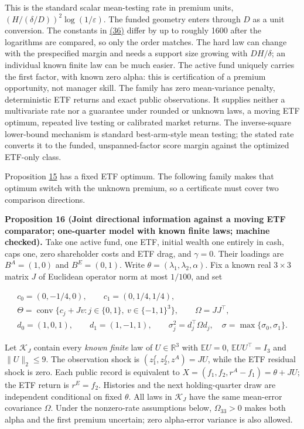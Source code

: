 \documentclass[11pt]{article}
\begin{document}
This is the standard scalar mean-testing rate in premium
units, \((H/(\delta/D))^2\log(1/\varepsilon)\). The funded
geometry enters through \(D\) as a unit conversion. The
constants in \hyperref[eq:36]{(36)} differ by up to roughly 1600 after the
logarithms are compared, so only the order matches. The hard
law can change with the prespecified margin and needs a
support size growing with \(DH/\delta\); an individual
known finite law can be much easier. The active fund uniquely
carries the first factor, with known zero alpha: this is
certification of a premium opportunity, not manager skill.
The family has zero mean-variance penalty, deterministic ETF
returns and exact public observations. It supplies neither a
multivariate rate nor a guarantee under rounded or unknown
laws, a moving ETF optimum, repeated live testing or calibrated
market returns. The inverse-square lower-bound mechanism is
standard best-arm-style mean testing; the stated rate converts it
to the funded, unspanned-factor score margin against the optimized
ETF-only class.

Proposition \hyperref[res:Proposition-15]{15} has a fixed ETF optimum. The following family
makes that optimum switch with the unknown premium, so a
certificate must cover two comparison directions.

\label{res:Proposition-16}
\textbf{Proposition 16 (Joint directional information against a moving ETF comparator; one-quarter model with known finite laws; machine checked).}
Take one active fund, one ETF, initial wealth one entirely in
cash, caps one, zero shareholder costs and ETF drag, and
\(\gamma=0\). Their loadings are
\(B^A=(1,0)\) and \(B^E=(0,1)\). Write
\(\theta=(\lambda_1,\lambda_2,\alpha)\). Fix a known real
\(3\times3\) matrix \(J\) of Euclidean operator norm at most
\(1/100\), and set

\begin{equation*}
\begin{gathered}
c_0=(0,-1/4,0),\qquad c_1=(0,1/4,1/4),\\
\Theta=\operatorname{conv}\{c_j+Jv:
j\in\{0,1\},\ v\in\{-1,1\}^3\},\qquad
\Omega=JJ^\top,\\
d_0=(1,0,1),\qquad d_1=(1,-1,1),\qquad
\sigma_j^2=d_j^\top\Omega d_j,\quad
\sigma=\max\{\sigma_0,\sigma_1\}.
\end{gathered}\tag{38}\label{eq:38}
\end{equation*}

Let \(\mathcal K_J\) contain every \emph{known finite} law of
\(U\in\mathbb R^3\) with
\(\mathbb E U=0\), \(\mathbb E UU^\top=I_3\) and
\(\|U\|_2\leq9\). The observation shock is
\((z^f_1,z^f_2,z^A)=JU\), while the ETF residual shock is
zero. Each public record is equivalent to
\(X=(f_1,f_2,r^A-f_1)=\theta+JU\); the ETF return is
\(r^E=f_2\). Histories and the next holding-quarter draw
are independent conditional on fixed \(\theta\). All laws
in \(\mathcal K_J\) have the same mean-error covariance
\(\Omega\). Under the nonzero-rate assumptions below,
\(\Omega_{33}>0\) makes both alpha and the first premium
uncertain; zero alpha-error variance is also allowed.
\end{document}
